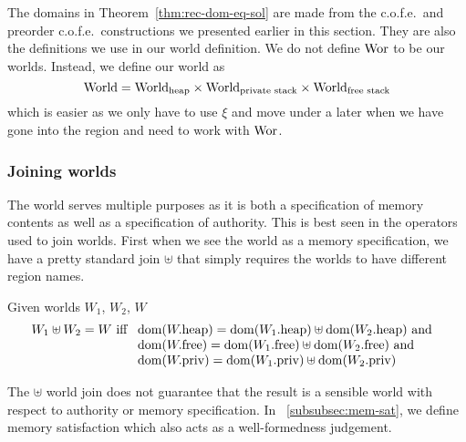\begin{jversion}
The domains in Theorem~\ref{thm:rec-dom-eq-sol} are made from the c.o.f.e.\ and preorder c.o.f.e.\ constructions we presented earlier in this section.
They are also the definitions we use in our world definition.
We do not define $\Wor$ to be our worlds.
Instead, we define our world as
\[
  \World = \Worldh \times \Worlds \times \Worldfs
\]
which is easier as we only have to use $\xi$ and move under a later when we have gone into the region and need to work with $\Wor$.

\subsubsection{Joining worlds}
\label{subsubsec:joining-worlds}
The world serves multiple purposes as it is both a specification of memory contents as well as a specification of authority.
This is best seen in the operators used to join worlds.
First when we see the world as a memory specification, we have a pretty standard join $\uplus$ that simply requires the worlds to have different region names.\begin{definition}
  Given worlds $W_1$, $W_2$, $W$
  \[
    W_1 \uplus W_2 = W
    \text{ iff }
    \begin{array}[t]{l}
      \dom(\pwheap) = \dom(\pwheap[W_1]) \uplus \dom(\pwheap[W_2]) \tand \\
      \dom(\pwfree) = \dom(\pwfree[W_1]) \uplus \dom(\pwfree[W_2]) \tand \\
      \dom(\pwpriv) = \dom(\pwpriv[W_1]) \uplus \dom(\pwpriv[W_2]) \\
    \end{array}
  \]
\end{definition}
The $\uplus$ world join does not guarantee that the result is a sensible world with respect to authority or memory specification.
In \sectionname~\ref{subsubsec:mem-sat}, we define memory satisfaction which also acts as a well-formedness judgement.


\end{jversion}
